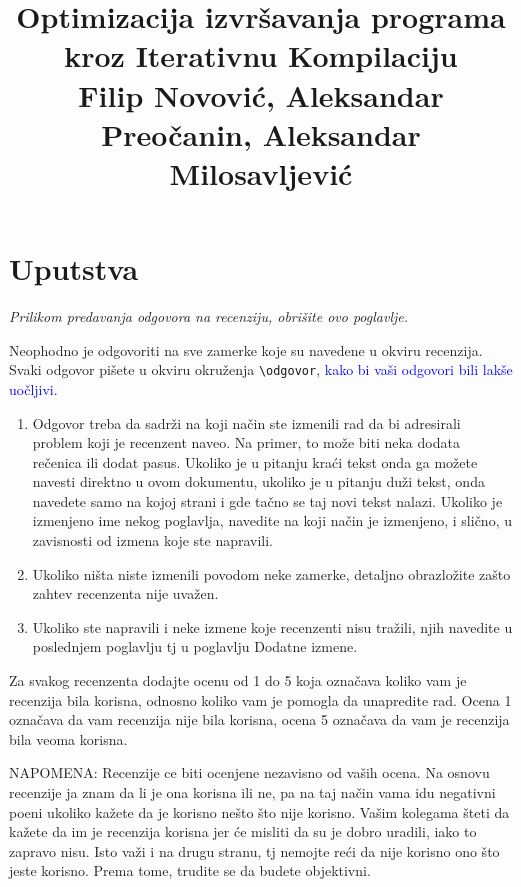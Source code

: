 \documentclass[a4paper]{report}
\newcommand{\odgovor}[1]{\textcolor{blue}{#1}}
\begin{document}
\title{Optimizacija izvršavanja programa kroz Iterativnu Kompilaciju\\ \small{Filip Novović, Aleksandar Preočanin, Aleksandar Milosavljević}}

\maketitle

\tableofcontents

\chapter{Uputstva}
\emph{Prilikom predavanja odgovora na recenziju, obrišite ovo poglavlje.}

Neophodno je odgovoriti na sve zamerke koje su navedene u okviru recenzija. Svaki odgovor pišete u okviru okruženja \verb"\odgovor", \odgovor{kako bi vaši odgovori bili lakše uočljivi.} 
\begin{enumerate}

\item Odgovor treba da sadrži na koji način ste izmenili rad da bi adresirali problem koji je recenzent naveo. Na primer, to može biti neka dodata rečenica ili dodat pasus. Ukoliko je u pitanju kraći tekst onda ga možete navesti direktno u ovom dokumentu, ukoliko je u pitanju duži tekst, onda navedete samo na kojoj strani i gde tačno se taj novi tekst nalazi. Ukoliko je izmenjeno ime nekog poglavlja, navedite na koji način je izmenjeno, i slično, u zavisnosti od izmena koje ste napravili. 

\item Ukoliko ništa niste izmenili povodom neke zamerke, detaljno obrazložite zašto zahtev recenzenta nije uvažen.

\item Ukoliko ste napravili i neke izmene koje recenzenti nisu tražili, njih navedite u poslednjem poglavlju tj u poglavlju Dodatne izmene.
\end{enumerate}

Za svakog recenzenta dodajte ocenu od 1 do 5 koja označava koliko vam je recenzija bila korisna, odnosno koliko vam je pomogla da unapredite rad. Ocena 1 označava da vam recenzija nije bila korisna, ocena 5 označava da vam je recenzija bila veoma korisna. 

NAPOMENA: Recenzije ce biti ocenjene nezavisno od vaših ocena. Na osnovu recenzije ja znam da li je ona korisna ili ne, pa na taj način vama idu negativni poeni ukoliko kažete da je korisno nešto što nije korisno. Vašim kolegama šteti da kažete da im je recenzija korisna jer će misliti da su je dobro uradili, iako to zapravo nisu. Isto važi i na drugu stranu, tj nemojte reći da nije korisno ono što jeste korisno. Prema tome, trudite se da budete objektivni. 
\end{document}
